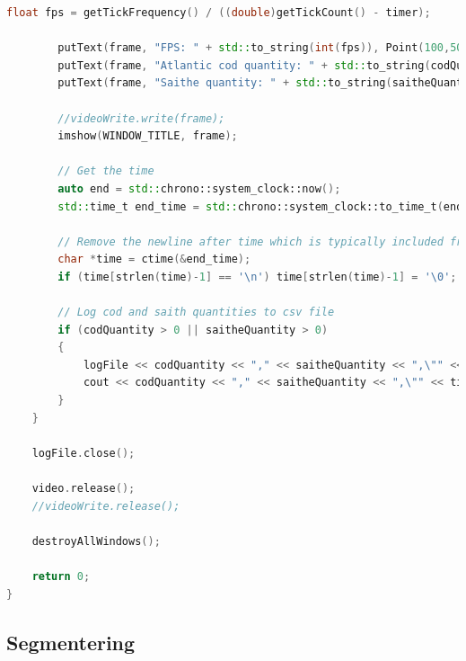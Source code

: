 \begin{lstlisting}[language=C++, caption=main.cpp]
        float fps = getTickFrequency() / ((double)getTickCount() - timer);

        putText(frame, "FPS: " + std::to_string(int(fps)), Point(100,50), FONT_HERSHEY_SIMPLEX, 0.75, Scalar(50,170,50), 2);
        putText(frame, "Atlantic cod quantity: " + std::to_string(codQuantity), Point(100,100), FONT_HERSHEY_SIMPLEX, 0.75, Scalar(50,170,50), 2);
        putText(frame, "Saithe quantity: " + std::to_string(saitheQuantity), Point(100,130), FONT_HERSHEY_SIMPLEX, 0.75, Scalar(50,170,50), 2);

        //videoWrite.write(frame);
        imshow(WINDOW_TITLE, frame);

        // Get the time
        auto end = std::chrono::system_clock::now();
        std::time_t end_time = std::chrono::system_clock::to_time_t(end);

        // Remove the newline after time which is typically included from the C library call
        char *time = ctime(&end_time);
        if (time[strlen(time)-1] == '\n') time[strlen(time)-1] = '\0';

        // Log cod and saith quantities to csv file
        if (codQuantity > 0 || saitheQuantity > 0)
        {
            logFile << codQuantity << "," << saitheQuantity << ",\"" << time << "\"" << endl;
            cout << codQuantity << "," << saitheQuantity << ",\"" << time << "\"" << endl;
        }
    }

    logFile.close();

    video.release();
    //videoWrite.release();

    destroyAllWindows();

    return 0;
}
\end{lstlisting}


\subsection{Segmentering}